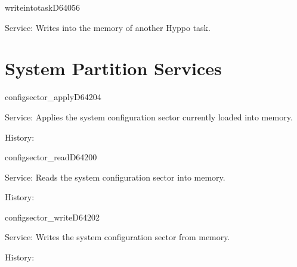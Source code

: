 \newpage
\begin{hyppotrap}{writeintotask}{D640}{56}
\item [Service:]
  Writes into the memory of another Hyppo task.
\notimplemented
\end{hyppotrap}



\newpage
\section{System Partition Services}


\begin{hyppotrap}{configsector\_apply}{D642}{04}
\item [Service:]
  Applies the system configuration sector currently loaded into memory.
\item [History:]
\end{hyppotrap}


\begin{hyppotrap}{configsector\_read}{D642}{00}
\item [Service:]
  Reads the system configuration sector into memory.
\item [History:]
\end{hyppotrap}


\begin{hyppotrap}{configsector\_write}{D642}{02}
\item [Service:]
  Writes the system configuration sector from memory.
\item [History:]
\end{hyppotrap}


